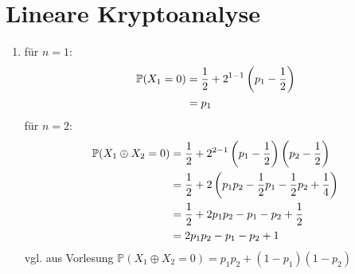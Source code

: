 \documentclass{article}
\begin{document}
	\section*{Lineare Kryptoanalyse}
	\begin{enumerate}[label=(\alph*)]
		\item für $n=1$:
		\begin{align}
			\mathbb{P}(X_1 = 0) &= \frac{1}{2} + 2^{1-1}\left(p_1 - \frac{1}{2}\right) \notag \\
			&= p_1 \notag
		\end{align}
		für $n=2$:
		\begin{align}
			\mathbb{P}(X_1\oplus X_2 = 0) &= \frac{1}{2} + 2^{2-1}\left(p_1 - \frac{1}{2}\right)\left(p_2 - \frac{1}{2}\right) \notag \\
			&= \frac{1}{2} + 2\left(p_1p_2  - \frac{1}{2}p_1 - \frac{1}{2}p_2 + \frac{1}{4}\right) \notag \\
			&= \frac{1}{2} + 2p_1p_2 - p_1 - p_2 + \frac{1}{2} \notag \\
			&= 2p_1p_2 - p_1 - p_2 + 1 \notag
		\end{align}
		vgl. aus Vorlesung $\mathbb{P}(X_1\oplus X_2=0) = p_1p_2 + (1-p_1)(1-p_2)$
	\end{enumerate}
\end{document}
